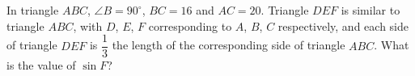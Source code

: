 In triangle $ABC$, $\angle B=90^\circ$, $BC=16$ and $AC=20$. Triangle $DEF$ is similar to triangle $ABC$, with $D$, $E$, $F$ corresponding to $A$, $B$, $C$ respectively, and each side of triangle $DEF$ is $\dfrac13$ the length of the corresponding side of triangle $ABC$. What is the value of $\sin F$?
